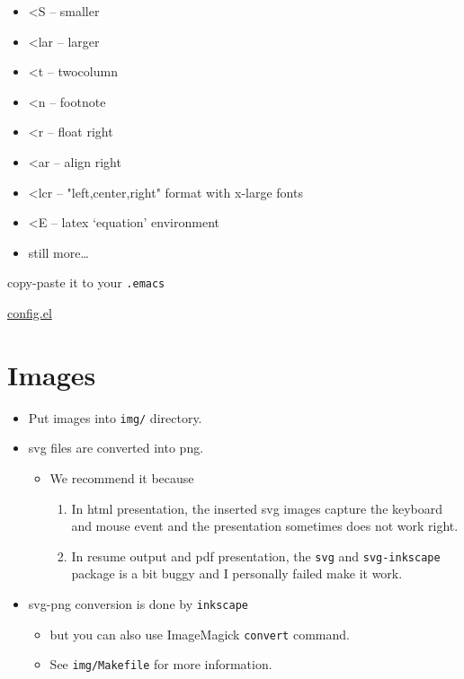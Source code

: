 \begin{container-fluid}
\begin{row-fluid}
\begin{span6}
\begin{itemize}
\item <S -- smaller
\item <lar -- larger
\item <t -- twocolumn
\item <n -- footnote
\item <r -- float right
\item <ar -- align right
\item <lcr -- "left,center,right" format with x-large fonts
\item <E -- latex `equation' environment
\item still more\ldots{}
\end{itemize}
\end{span6}
\begin{span6}
copy-paste it
to your \texttt{.emacs}

\begin{center}
\url{config.el}
\end{center}
\end{span6}
\end{row-fluid}
\end{container-fluid}

\section{Images}
\label{sec-7}

\begin{itemize}
\item Put images into \texttt{img/} directory.
\item svg files are converted into png.
\begin{itemize}
\item We recommend it because
\begin{enumerate}
\item In html presentation, the inserted svg images capture the keyboard and mouse event
and the presentation sometimes does not work right.
\item In resume output and pdf presentation, the \texttt{svg} and \texttt{svg-inkscape} package is a
bit buggy and I personally failed make it work.
\end{enumerate}
\end{itemize}
\item svg-png conversion is done by \texttt{inkscape}
\begin{itemize}
\item but you can also use ImageMagick \texttt{convert} command.
\item See \texttt{img/Makefile} for more information.
\end{itemize}
\end{itemize}

